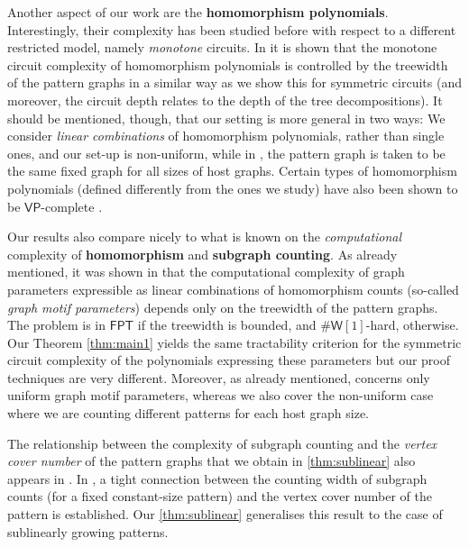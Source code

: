 \documentclass[11pt, DIV=15]{scrarticle}
\theoremstyle{definition}
\theoremstyle{plain}
\theoremstyle{remark}
\newcommand{\VP}{\mathsf{VP}}
\begin{document}
Another aspect of our work are the \textbf{homomorphism polynomials}. Interestingly, their complexity has been studied before with respect to a different restricted model, namely \emph{monotone} circuits. In \cite{KomarathPR23, PrateekRadu25} it is shown that the monotone circuit complexity of homomorphism polynomials is controlled by the treewidth of the pattern graphs in a similar way as we show this for symmetric circuits (and moreover, the circuit depth relates to the depth of the tree decompositions). It should be mentioned, though, that our setting is more general in two ways: We consider \emph{linear combinations} of homomorphism polynomials, rather than single ones, and our set-up is non-uniform, while in \cite{KomarathPR23, PrateekRadu25}, the pattern graph is taken to be the same fixed graph for all sizes of host graphs. 
Certain types of homomorphism polynomials (defined differently from the ones we study) have also been shown to be $\VP$-complete \cite{durand2014homomorphism}.

Our results also compare nicely to what is known on the \emph{computational} complexity of \textbf{homomorphism} and  \textbf{subgraph counting}. 
As already mentioned, it was shown in \cite{curticapean_homomorphisms_2017} that the computational complexity of graph parameters expressible as linear combinations of homomorphism counts (so-called \emph{graph motif parameters}) depends only on the treewidth of the pattern graphs. The problem is in $\mathsf{FPT}$ if the treewidth is bounded, and $\mathsf{\# W}[1]$-hard, otherwise. 
Our Theorem \ref{thm:main1} yields the same tractability criterion for the symmetric circuit complexity of the polynomials expressing these parameters but our proof techniques are very different. 
Moreover, as already mentioned, \cite{curticapean_homomorphisms_2017} concerns only uniform graph motif parameters, whereas we also cover the non-uniform case where we are counting different patterns for each host graph size.


The relationship between the complexity of subgraph counting and the \emph{vertex cover number} of the pattern graphs that we obtain in \cref{thm:sublinear} also appears in \cite{curticapean_homomorphisms_2017}. In \cite[Theorem 1.3]{neuen_homomorphism-distinguishing_2024}, a tight connection between the counting width of subgraph counts (for a fixed constant-size pattern) and the vertex cover number of the pattern is established. 
Our  \cref{thm:sublinear} generalises this result to the case of sublinearly growing patterns. 
\end{document}
